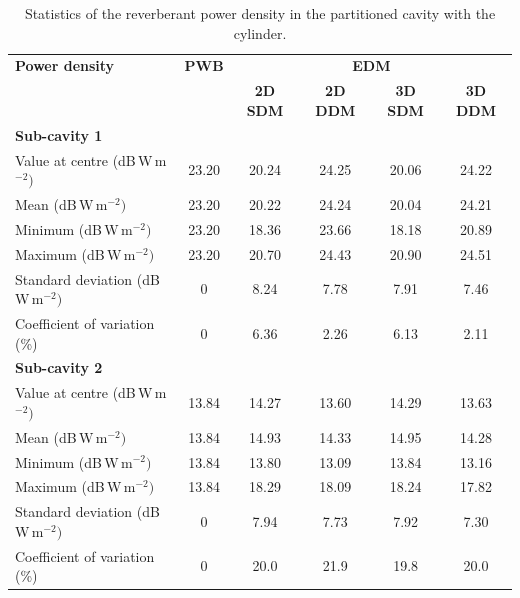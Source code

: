 \documentclass[a4paper]{article}
\numberwithin{equation}{section}
\begin{document}
\begin{table}[H]
\begin{center}
\begin{tabular}{|l|c|c|c|c|c|}
\hline
\textbf{Power density}               &\textbf{PWB} &\multicolumn{4}{|c|}{\textbf{EDM}} \\ \cline{3-6}
{}                                   &{}           &\textbf{2D SDM} &\textbf{2D DDM} &\textbf{3D SDM} &\textbf{3D DDM} \\
\hline
\multicolumn{6}{|l|}{\textbf{Sub-cavity 1}} \\
\hline
Value at centre (dB\,W\,m$^{-2})$    &23.20        &20.24           &24.25           &20.06           &24.22 \\
Mean (dB\,W\,m$^{-2})$               &23.20        &20.22           &24.24           &20.04           &24.21 \\
Minimum (dB\,W\,m$^{-2})$            &23.20        &18.36           &23.66           &18.18           &20.89 \\
Maximum (dB\,W\,m$^{-2})$            &23.20        &20.70           &24.43           &20.90           &24.51 \\
Standard deviation (dB\,W\,m$^{-2})$ &0            &8.24            &7.78            &7.91            &7.46  \\
Coefficient of variation (\%)        &0            &6.36            &2.26            &6.13            &2.11  \\
\hline
\multicolumn{6}{|l|}{\textbf{Sub-cavity 2}} \\
\hline
Value at centre (dB\,W\,m$^{-2})$    &13.84        &14.27           &13.60           &14.29           &13.63 \\
Mean (dB\,W\,m$^{-2})$               &13.84        &14.93           &14.33           &14.95           &14.28 \\
Minimum (dB\,W\,m$^{-2})$            &13.84        &13.80           &13.09           &13.84           &13.16 \\
Maximum (dB\,W\,m$^{-2})$            &13.84        &18.29           &18.09           &18.24           &17.82 \\
Standard deviation (dB\,W\,m$^{-2})$ &0            &7.94            &7.73            &7.92            &7.30  \\
Coefficient of variation (\%)        &0            &20.0            &21.9            &19.8            &20.0  \\
\hline
\end{tabular}
\end{center}
\caption{\label{tb:partcyl} Statistics of the reverberant power density in the partitioned cavity with the cylinder.}
\end{table}
\end{document}
